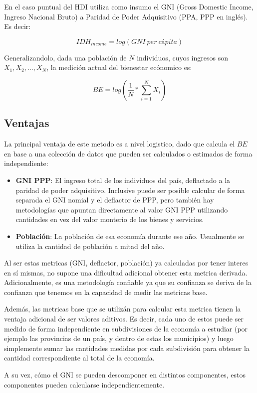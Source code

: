 En el caso puntual del HDI utiliza como insumo el GNI (Gross Domestic Income, Ingreso Nacional Bruto) a Paridad de Poder Adquisitivo (PPA, PPP en inglés). Es decir:

$$
IDH_{income} = log(GNI\ per\ cápita)
$$

Generalizandolo, dada una población de $N$ individuos, cuyos ingresos son $X_1, X_2, \dots, X_N$, la medición actual del bienestar ecónomico es:

$$
    BE = log(\frac{1}{N} * \sum_{i=1}^{N}X_i)
$$

\subsection{Ventajas}

La principal ventaja de este metodo es a nivel logistico, dado que calcula el $BE$ en base a una colección de datos que pueden ser calculados o estimados de forma independiente:

\begin{itemize}
    \item \textbf{GNI PPP}: El ingreso total de los individuos del país, deflactado a la paridad de poder adquisitivo. Inclusive puede ser posible calcular de forma separada el GNI nomial y el deflactor de PPP, pero también hay metodologías que apuntan directamente al valor GNI PPP utilizando cantidades en vez del valor monterio de los bienes y servicios. 
    \item \textbf{Población}: La población de esa economía durante ese año. Usualmente se utiliza la cantidad de población a mitad del año.
\end{itemize}

Al ser estas metricas (GNI, deflactor, población) ya calculadas por tener interes en sí mismas, no supone una dificultad adicional obtener esta metrica derivada. Adicionalmente, es una metodología confiable ya que su confianza se deriva de la confianza que tenemos en la capacidad de medir las metricas base.

Además, las metricas base que se utilizán para calcular esta metrica tienen la ventaja adicional de ser valores aditivos. Es decir, cada uno de estos puede ser medido de forma independiente en subdivisiones de la economía a estudiar (por ejemplo las provincias de un país, y dentro de estas los municipios) y luego simplemente sumar las cantidades medidas por cada subdivisión para obtener la cantidad correspondiente al total de la economía. 

A su vez, cómo el GNI se pueden descomponer en distintos componentes, estos componentes pueden calcularse independientemente.

